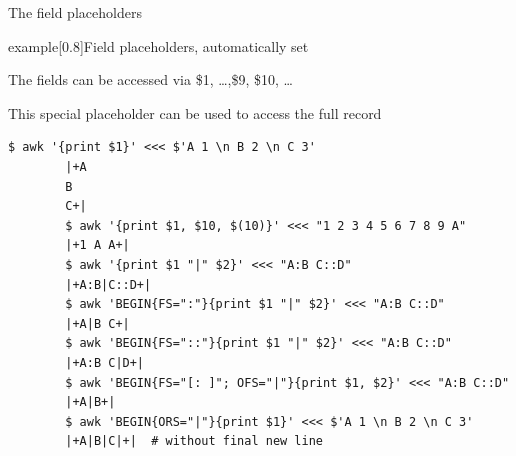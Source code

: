 \begin{frame}[fragile]{The field placeholders}
    \vspace{-3mm}
    \begin{varblock}{example}[0.8\textwidth]{Field placeholders, automatically set}
        \begin{description}[XXXXXX]
            \item[\$n] The fields can be accessed via \$1, \ldots,\$9, \$10, \ldots
            \item[\$0] This special placeholder can be used to access the full record
        \end{description}
    \end{varblock}
    \begin{lstlisting}[style=MyBash, xleftmargin=3mm, xrightmargin=3mm]
        $ awk '{print $1}' <<< $'A 1 \n B 2 \n C 3'
        |+A
        B
        C+|
        $ awk '{print $1, $10, $(10)}' <<< "1 2 3 4 5 6 7 8 9 A"
        |+1 A A+|
        $ awk '{print $1 "|" $2}' <<< "A:B C::D"
        |+A:B|C::D+|
        $ awk 'BEGIN{FS=":"}{print $1 "|" $2}' <<< "A:B C::D"
        |+A|B C+|
        $ awk 'BEGIN{FS="::"}{print $1 "|" $2}' <<< "A:B C::D"
        |+A:B C|D+|
        $ awk 'BEGIN{FS="[: ]"; OFS="|"}{print $1, $2}' <<< "A:B C::D"
        |+A|B+|
        $ awk 'BEGIN{ORS="|"}{print $1}' <<< $'A 1 \n B 2 \n C 3'
        |+A|B|C|+|  # without final new line
    \end{lstlisting}
\end{frame}
